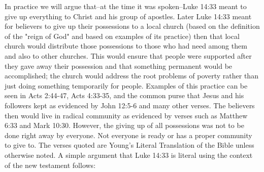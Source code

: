 \documentclass[11pt]{article}
\begin{document}
In practice we will argue that--at the time it was spoken--Luke 14:33 meant to give up everything to Christ and his group of apostles. Later Luke 14:33 meant for believers to give up their possessions to a local church (based on the definition of the "reign of God" and based on examples of its practice) then that local church would distribute those possessions to those who had need among them and also to other churches. This would ensure that people were supported after they gave away their possession and that something permanent would be accomplished; the church would address the root problems of poverty rather than just doing something temporarily for people. Examples of this practice can be seen in Acts 2:44-47, Acts 4:33-35, and the common purse that Jesus and his followers kept as evidenced by John 12:5-6 and many other verses. The believers then would live in radical community as evidenced by verses such as Matthew 6:33 and Mark 10:30. However, the giving up of all possessions was not to be done right away by everyone. Not everyone is ready or has a proper community to give to. The verses quoted are Young's Literal Translation of the Bible unless otherwise noted. A simple argument that Luke 14:33 is literal using the context of the new testament follows:
\end{document}
